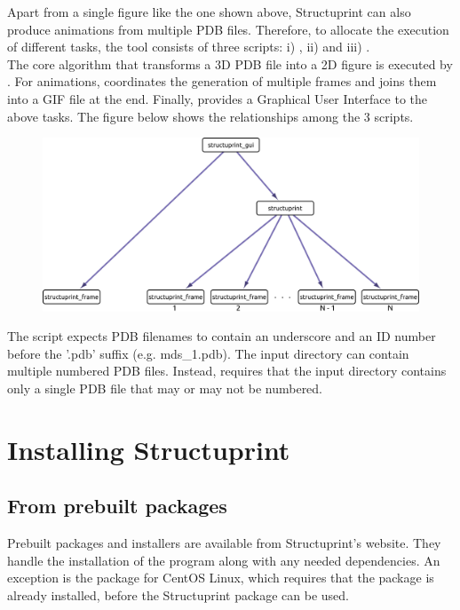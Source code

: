 \documentclass[12pt,a4paper]{article}
\begin{document}
Apart from a single figure like the one shown above, Structuprint can 
also produce animations from multiple PDB files. Therefore, to allocate 
the execution of different tasks, the tool consists of three 
scripts: i) , ii)  
and iii) .\\
\newline
The core algorithm that transforms a 3D PDB file into a 2D figure is 
executed by . For animations, 
 coordinates the generation of multiple frames 
and joins them into a GIF file at the end. Finally,  
provides a Graphical User Interface to the above tasks. The figure 
below shows the relationships among the 3 scripts.
\begin{figure}[!htbp]
    \centering
	\includegraphics[width=\textwidth]{figures/diagram.png}
\end{figure}

The  script expects PDB filenames to contain 
an underscore and an ID number before the '.pdb' suffix (e.g. mds\_1.pdb). 
The input directory can contain multiple numbered PDB files. Instead, 
 requires that the input directory contains only 
a single PDB file that may or may not be numbered.

\newpage

\section{Installing Structuprint}
\subsection{From prebuilt packages}
Prebuilt packages and installers are available from Structuprint's website. 
They handle the installation of the program along with any needed 
dependencies. An exception is the package for CentOS Linux, which requires  
that the  package is already installed, before the Structuprint 
package can be used.
\end{document}
